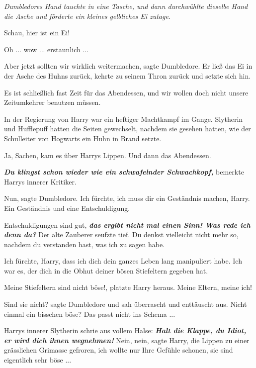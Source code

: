 \emph{Dumbledores Hand tauchte in eine Tasche, und dann durchwühlte dieselbe
Hand die Asche und förderte ein kleines gelbliches Ei zutage.}

\glqq{}Schau, hier ist ein Ei!\grqq{}

\glqq{}Oh ... wow ... erstaunlich ...\grqq{}

\glqq{}Aber jetzt sollten wir wirklich weitermachen\grqq{}, sagte Dumbledore. Er
ließ das Ei in der Asche des Huhns zurück, kehrte zu seinem Thron zurück und
setzte sich hin.

\glqq{}Es ist schließlich fast Zeit für das Abendessen, und wir wollen doch nicht
unsere Zeitumkehrer benutzen müssen.\grqq{}

In der Regierung von Harry war ein heftiger Machtkampf im Gange. Slytherin und
Hufflepuff hatten die Seiten gewechselt, nachdem sie gesehen hatten, wie der
Schulleiter von Hogwarts ein Huhn in Brand setzte.

\glqq{}Ja, Sachen\grqq{}, kam es über Harrys Lippen. \glqq{}Und dann das
Abendessen.\grqq{}

\textbf{\emph{Du klingst schon wieder wie ein schwafelnder Schwachkopf,
}}bemerkte Harrys innerer Kritiker.

\glqq{}Nun\grqq{}, sagte Dumbledore. \glqq{}Ich fürchte, ich muss dir ein
Geständnis machen, Harry. Ein Geständnis und eine Entschuldigung.\grqq{}

\glqq{}Entschuldigungen sind gut\grqq{}, \textbf{\emph{das ergibt nicht mal einen
Sinn! Was rede ich denn da?}} Der alte Zauberer seufzte tief. \glqq{}Du denkst
vielleicht nicht mehr so, nachdem du verstanden hast, was ich zu sagen habe.

Ich fürchte, Harry, dass ich dich dein ganzes Leben lang manipuliert habe. Ich
war es, der dich in die Obhut deiner bösen Stiefeltern gegeben hat.\grqq{}

\glqq{}Meine Stiefeltern sind nicht böse!\grqq{}, platzte Harry heraus. \glqq{}
Meine Eltern, meine ich!\grqq{}

\glqq{}Sind sie nicht?\grqq{} sagte Dumbledore und sah überrascht und enttäuscht
aus. \glqq{}Nicht einmal ein bisschen böse? Das passt nicht ins Schema ...\grqq{}

Harrys innerer Slytherin schrie aus vollem Halse: \glqq{}\textbf{\emph{Halt die
Klappe, du Idiot, er wird dich ihnen wegnehmen!}} \glqq{}Nein, nein\grqq{}, sagte
Harry, die Lippen zu einer grässlichen Grimasse gefroren, \glqq{}ich wollte nur
Ihre Gefühle schonen, sie sind eigentlich sehr böse ...\grqq{}

